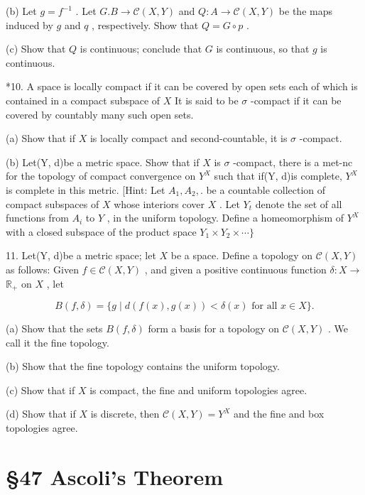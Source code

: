 (b) Let \(g = {f}^{-1}\) . Let \(G.B \rightarrow  \mathcal{C}\left( {X,Y}\right)\) and \(Q : A \rightarrow  \mathcal{C}\left( {X,Y}\right)\) be the maps induced by \(g\) and \(q\) , respectively. Show that \(Q = G \circ  p\) .

(c) Show that \(Q\) is continuous; conclude that \(G\) is continuous, so that \(g\) is continuous.

*10. A space is locally compact if it can be covered by open sets each of which is contained in a compact subspace of \(X\) It is said to be \(\sigma\) -compact if it can be covered by countably many such open sets.

(a) Show that if \(X\) is locally compact and second-countable, it is \(\sigma\) -compact.

(b) Let(Y, d)be a metric space. Show that if \(X\) is \(\sigma\) -compact, there is a met-nc for the topology of compact convergence on \({Y}^{X}\) such that if(Y, d)is complete, \({Y}^{X}\) is complete in this metric. [Hint: Let \({A}_{1},{A}_{2},.\) be a countable collection of compact subspaces of \(X\) whose interiors cover \(X\) . Let \({Y}_{t}\) denote the set of all functions from \({A}_{i}\) to \(Y\) , in the uniform topology. Define a homeomorphism of \({Y}^{X}\) with a closed subspace of the product space \({Y}_{1} \times  {Y}_{2} \times  \cdots \}\)

11. Let(Y, d)be a metric space; let \(X\) be a space. Define a topology on \(\mathcal{C}\left( {X,Y}\right)\) as follows: Given \(f \in  \mathcal{C}\left( {X,Y}\right)\) , and given a positive continuous function \(\delta  : X \rightarrow\)  \({\mathbb{R}}_{ + }\) on \(X\) , let

\[
B\left( {f,\delta }\right)  = \{ g \mid  d\left( {f\left( x\right) ,g\left( x\right) }\right)  < \delta \left( x\right) \text{ for all }x \in  X\} .
\]

(a) Show that the sets \(B\left( {f,\delta }\right)\) form a basis for a topology on \(\mathcal{C}\left( {X,Y}\right)\) . We call it the fine topology.

(b) Show that the fine topology contains the uniform topology.

(c) Show that if \(X\) is compact, the fine and uniform topologies agree.

(d) Show that if \(X\) is discrete, then \(\mathcal{C}\left( {X,Y}\right)  = {Y}^{X}\) and the fine and box topologies agree.

\section*{§47 Ascoli’s Theorem}

